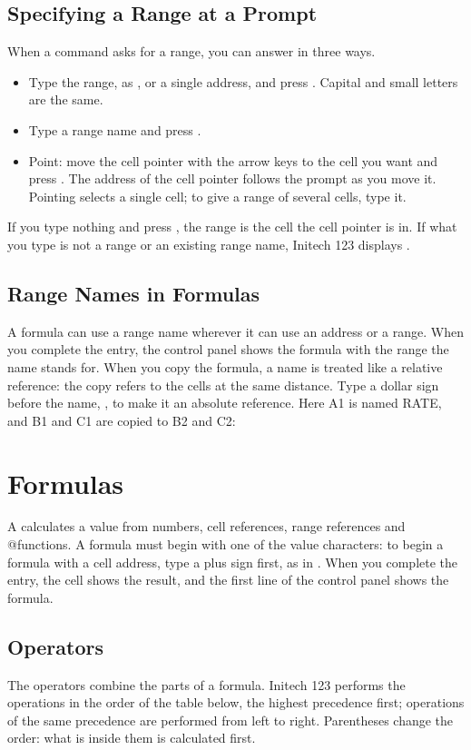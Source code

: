 \subsection{Specifying a Range at a Prompt}
When a command asks for a range, you can answer in three ways.
\begin{itemize}
\item Type the range, as , or a single address, and press
  .  Capital and small letters are the same.
\item Type a range name and press .
\item Point: move the cell pointer with the arrow keys to the cell you
  want and press .  The address of the cell pointer follows
  the prompt as you move it.  Pointing selects a single cell; to give a
  range of several cells, type it.
\end{itemize}
If you type nothing and press , the range is the cell the
cell pointer is in.  If what you type is not a range or an existing range
name, Initech 123 displays .

\subsection{Range Names in Formulas}
A formula can use a range name wherever it can use an address or a range.
When you complete the entry, the control panel shows the formula with the
range the name stands for.  When you copy the formula, a name is treated
like a relative reference: the copy refers to the cells at the same
distance.  Type a dollar sign before the name, , to make it an
absolute reference.  Here A1 is named RATE, and B1 and C1 are copied to
B2 and C2:


\section{Formulas}
A  calculates a value from numbers, cell references, range
references and @functions.  A formula must begin with one of the value
characters: to begin a formula with a cell address, type a plus sign
first, as in .  When you complete the entry, the cell shows
the result, and the first line of the control panel shows the formula.

\subsection{Operators}
The operators combine the parts of a formula.  Initech 123 performs the
operations in the order of the table below, the highest precedence first;
operations of the same precedence are performed from left to right.
Parentheses change the order: what is inside them is calculated first.

